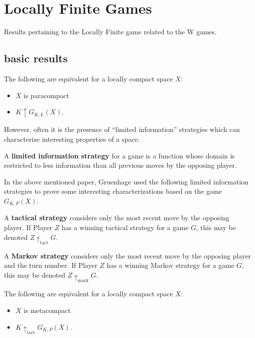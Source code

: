 
\chapter{Locally Finite Games}

Results pertaining to the Locally Finite game related to the W games.


\section{basic results}


\begin{theorem}
The following are equivalent for a locally compact space $X$:
    \begin{itemize}
    \item $X$ is paracompact
    \item $K \uparrow G_{K,L}(X)$.
    \end{itemize}
\end{theorem}

However, often it is the presence of ``limited information'' strategies which can characterize interesting properties of a space.

\begin{definition}
A \textbf{limited information strategy} for a game is a function whose domain is restricted to less information than all previous moves by the opposing player.
\end{definition}

In the above mentioned paper, Gruenhage used the following limited information strategies to prove some interesting characterizations based on the game $G_{K,P}(X)$.

\begin{definition}
A \textbf{tactical strategy} considers only the most recent move by the opposing player. If Player $Z$ has a winning tactical strategy for a game $G$, this may be denoted $Z \uparrow_{\text{tact}} G$.
\end{definition}

\begin{definition}
A \textbf{Markov strategy} considers only the most recent move by the opposing player and the turn number. If Player $Z$ has a winning Markov strategy for a game $G$, this may be denoted $Z \uparrow_{\text{mark}} G$.
\end{definition}

\begin{theorem}
The following are equivalent for a locally compact space $X$:
    \begin{itemize}
    \item $X$ is metacompact
    \item $K \uparrow_{\text{tact}}G_{K,P}(X)$.
    \end{itemize}
\end{theorem}

